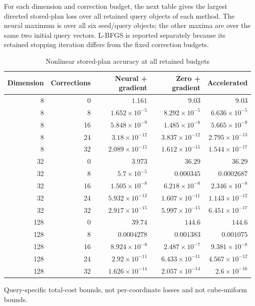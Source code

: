 For each dimension and correction budget, the next table gives the largest directed stored-plan loss over all retained query objects of each method. The neural maximum is over all six seed/query objects; the other maxima are over the same two initial query vectors. L-BFGS is reported separately because its retained stopping iteration differs from the fixed correction budgets.

\begin{table}[t]\centering\small\caption{Nonlinear stored-plan accuracy at all retained budgets}\begin{tabular}{rrrrr}\toprule
Dimension & Corrections & Neural + gradient & Zero + gradient & Accelerated\\\midrule
8 & 0 & $1.161$ & $9.03$ & $9.03$ \\
8 & 8 & $1.652\times10^{-5}$ & $8.292\times10^{-5}$ & $6.636\times10^{-5}$ \\
8 & 16 & $5.848\times10^{-9}$ & $1.485\times10^{-8}$ & $5.665\times10^{-9}$ \\
8 & 24 & $3.18\times10^{-12}$ & $3.837\times10^{-12}$ & $2.795\times10^{-13}$ \\
8 & 32 & $2.089\times10^{-15}$ & $1.612\times10^{-15}$ & $1.544\times10^{-17}$ \\
32 & 0 & $3.973$ & $36.29$ & $36.29$ \\
32 & 8 & $5.7\times10^{-5}$ & $0.000345$ & $0.0002687$ \\
32 & 16 & $1.505\times10^{-8}$ & $6.218\times10^{-8}$ & $2.346\times10^{-8}$ \\
32 & 24 & $5.932\times10^{-12}$ & $1.607\times10^{-11}$ & $1.143\times10^{-12}$ \\
32 & 32 & $2.917\times10^{-15}$ & $5.997\times10^{-15}$ & $6.451\times10^{-17}$ \\
128 & 0 & $39.74$ & $144.6$ & $144.6$ \\
128 & 8 & $0.0004278$ & $0.001383$ & $0.001075$ \\
128 & 16 & $8.924\times10^{-8}$ & $2.487\times10^{-7}$ & $9.381\times10^{-8}$ \\
128 & 24 & $2.92\times10^{-11}$ & $6.433\times10^{-11}$ & $4.567\times10^{-12}$ \\
128 & 32 & $1.626\times10^{-14}$ & $2.057\times10^{-14}$ & $2.6\times10^{-16}$ \\
\bottomrule\end{tabular}\par\smallskip\footnotesize Query-specific total-cost bounds, not per-coordinate losses and not cube-uniform bounds.\end{table}

